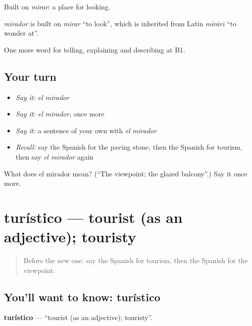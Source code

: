 Built on \emph{mirar}: a place for looking.

\begin{cousinweb}
\emph{mirador} is built on \emph{mirar} \textquotedblleft{}to look\textquotedblright{}, which is inherited from Latin \emph{mīrārī} \textquotedblleft{}to wonder at\textquotedblright{}.
\end{cousinweb}

\begin{grammarlens}[title={What you've built}]
One more word for telling, explaining and describing at B1.
\end{grammarlens}

\subsection*{Your turn}
\begin{itemize}
\raggedright
  \item \emph{Say it:} \emph{el mirador}
  \item \emph{Say it:} \emph{el mirador}, once more
  \item \emph{Say it:} a sentence of your own with \emph{el mirador}
  \item \emph{Recall:} say the Spanish for the paving stone, then the Spanish for tourism, then say \emph{el mirador} again
\end{itemize}

\begin{tcolorbox}[breakable,colback=teal!4,colframe=teal!35!black,title={Before you move on}]
What does el mirador mean? (\textquotedblleft{}The viewpoint; the glazed balcony\textquotedblright{}.) Say it once more.
\end{tcolorbox}
\section[turístico]{turístico — tourist (as an adjective); touristy}

\label{lesson:ES-C676-turistico}



\begin{quote}
Before the new one: say the Spanish for tourism, then the Spanish for the viewpoint.
\end{quote}

\subsection*{You'll want to know: turístico}
\textbf{turístico} — \textquotedblleft{}tourist (as an adjective); touristy\textquotedblright{}.

